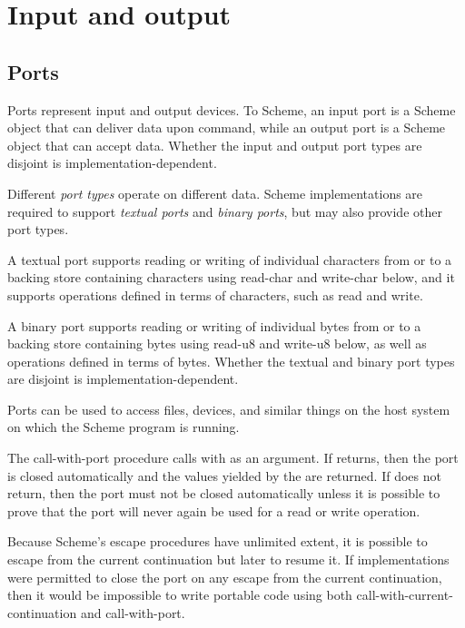 \section{Input and output}

\subsection{Ports}
\label{portsection}

Ports represent input and output devices.  To Scheme, an input port is
a Scheme object that can deliver data upon command, while an output
port is a Scheme object that can accept data.
Whether the input and output port types are disjoint is
implementation-dependent.

Different {\em port types} operate on different data.  Scheme
imple\-men\-ta\-tions are required to support {\em textual ports}
and {\em binary ports}, but may also provide other port types.

A textual port supports reading or writing of individual characters
from or to a backing store containing characters
using {\cf read-char} and {\cf write-char} below, and it supports operations
defined in terms of characters, such as {\cf read} and {\cf write}.

A binary port supports reading or writing of individual bytes from
or to a backing store containing bytes using {\cf read-u8} and {\cf
write-u8} below, as well as operations defined in terms of bytes.
Whether the textual and binary port types are disjoint is
implementation-dependent.

Ports can be used to access files, devices, and similar things on the host
system on which the Scheme program is running.

\begin{entry}{
}

The {\cf call-with-port}
procedure calls  with  as an argument.
If  returns,
then the port is closed automatically and the values yielded by the
 are returned.  If  does not return, then
the port must not be closed automatically unless it is possible to
prove that the port will never again be used for a read or write
operation.

\begin{rationale}
Because Scheme's escape procedures have unlimited extent, it  is
possible to escape from the current continuation but later to resume it.
If implementations were permitted to close the port on any escape from the
current continuation, then it would be impossible to write portable code using
both {\cf call-with-current-continuation} and {\cf call-with-port}.
\end{rationale}

\end{entry}

